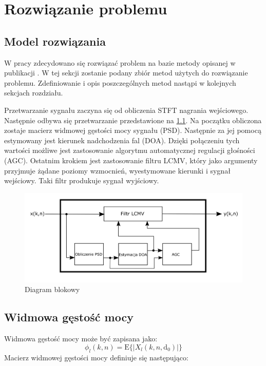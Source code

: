 \chapter{Rozwiązanie problemu}
\label{chapter-3}

\section{Model rozwiązania}

W pracy zdecydowano się rozwiązać problem na bazie metody opisanej w publikacji \cite{Braun2014}. W tej sekcji zostanie podany zbiór metod użytych do rozwiązanie problemu. Zdefiniowanie i opis poszczególnych metod nastąpi w kolejnych sekcjach rozdziału.

\noindent Przetwarzanie sygnału zaczyna się od obliczenia STFT nagrania wejściowego. Następnie odbywa się przetwarzanie przedstawione na \ref{fig:block_diagram}. Na początku obliczona zostaje macierz widmowej gęstości mocy sygnału (PSD). Następnie za jej pomocą estymowany jest kierunek nadchodzenia fal (DOA). Dzięki połączeniu tych wartości możliwe jest zastosowanie algorytmu automatycznej regulacji głośności (AGC). Ostatnim krokiem jest zastosowanie filtru LCMV, który jako argumenty przyjmuje żądane poziomy wzmocnień, wyestymowane kierunki i sygnał wejściowy. Taki filtr produkuje sygnał wyjściowy. 

\begin{figure}[h]
    \centering
    \includegraphics[width=\textwidth]{Images/block_diagram.png}
    \caption{Diagram blokowy}
    \label{fig:block_diagram}
\end{figure}

\section{Widmowa gęstość mocy}

Widmowa gęstość mocy może być zapisana jako:
\begin{equation}
    \label{equation:PSD}
    \phi_{l}(k,n) = \mathrm{E}
    \{|X_{l}(k,n,\bm{\mathrm{d}}_{0})|\}
\end{equation}
Macierz widmowej gęstości mocy definiuje się następująco:

